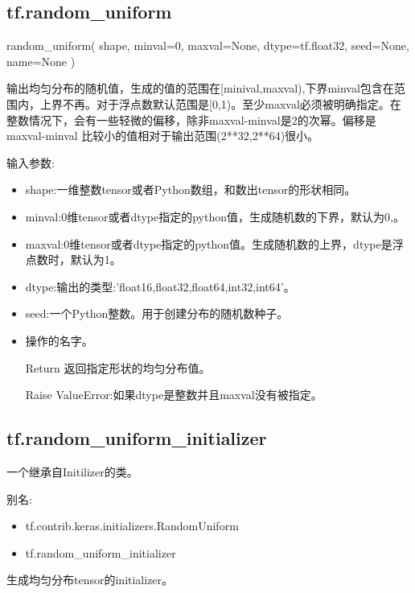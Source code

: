 \subsection{tf.random\_uniform}
\begin{python}
random_uniform(
    shape,
    minval=0,
    maxval=None,
    dtype=tf.float32,
    seed=None,
    name=None
)
\end{python}
输出均匀分布的随机值，生成的值的范围在[minival,maxval),下界minval包含在范围内，上界不再。对于浮点数默认范围是[0,1)。至少maxval必须被明确指定。在整数情况下，会有一些轻微的偏移，除非maxval-minval是2的次幂。偏移是maxval-minval
比较小的值相对于输出范围(2**32,2**64)很小。

输入参数:
\begin{itemize}
\item shape:一维整数tensor或者Python数组，和数出tensor的形状相同。
\item minval:0维tensor或者dtype指定的python值，生成随机数的下界，默认为0,。
\item maxval:0维tensor或者dtype指定的python值。生成随机数的上界，dtype是浮点数时，默认为1。
\item dtype:输出的类型:'float16,float32,float64,int32,int64'。
\item seed:一个Python整数。用于创建分布的随机数种子。
\item 操作的名字。
\item [Return] 返回指定形状的均匀分布值。
\item [Raise] ValueError:如果dtype是整数并且maxval没有被指定。
\end{itemize}
\subsection{\textbf{tf.random\_uniform\_initializer}}
一个继承自Initilizer的类。

别名:
\begin{itemize}
\item tf.contrib.keras.initializers.RandomUniform
\item tf.random\_uniform\_initializer
\end{itemize}
生成均匀分布tensor的initializer。

